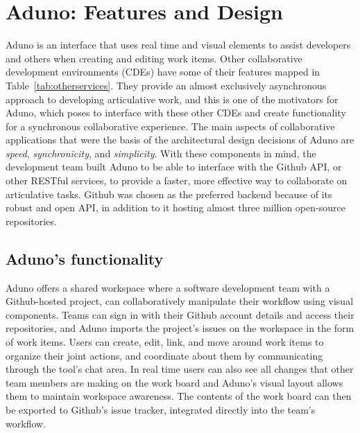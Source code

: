 \documentclass[conference]{IEEEtran}
\begin{document}
\section{Aduno: Features and Design}
\label{sec:concept}

Aduno is an interface that uses real time and visual elements to assist developers and others when creating and editing work items.  Other collaborative development environments (CDEs) have some of their features mapped in Table~\ref{tab:otherservices}.  They provide an almost exclusively asynchronous approach to developing articulative work, and this is one of the motivators for Aduno, which poses to interface with these other CDEs and create functionality for a synchronous collaborative experience.  The main aspects of collaborative applications that were the basis of the architectural design decisions of Aduno are \emph{speed}, \emph{synchronicity}, and \emph{simplicity}.  With these components in mind, the development team built Aduno to be able to interface with the Github API, or other RESTful services, to provide a faster, more effective way to collaborate on articulative tasks.  Github was chosen as the preferred backend because of its robust and open API, in addition to it hosting almost three million open-source repositories.

\subsection{Aduno's functionality}
Aduno offers a shared workspace where a software development team with a Github-hosted project, can collaboratively manipulate their workflow using visual components. Teams can sign in with their Github account details and access their repositories, and Aduno imports the project's issues on the workspace in the form of work items. Users can create, edit, link, and move around work items to organize their joint actions, and coordinate about them by communicating through the tool's chat area. In real time users can also see all changes that other team members are making on the work board and Aduno's visual layout allows them to maintain workspace awareness. The contents of the work board can then be exported to Github's issue tracker, integrated directly into the team's workflow.
\end{document}
